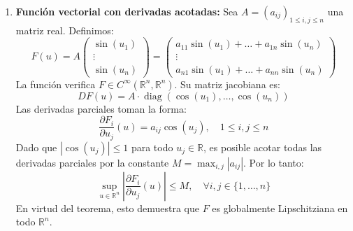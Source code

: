 {\begin{enumerate}
        En cambio, si nos alejamos del origen la situación mejora: para cada $\eta > 0$,
        \[
            \sup_{u \in (\eta, +\infty)} \left| \frac{dF}{du}(u) \right| = \sup_{u > \eta} \frac{q}{u^{1-q}} = \frac{q}{\eta^{1-q}} < +\infty,
        \]
        y como $(\eta, +\infty)$ es abierto y convexo, por el teorema $F$ es \textbf{globalmente} Lipschitziana en $(\eta, +\infty)$ (y, por continuidad, también en $[\eta, +\infty)$), para cualquier $\eta > 0$.

        \item \textbf{Función vectorial con derivadas acotadas:}
        Sea $A = (a_{ij})_{1 \leq i,j \leq n}$ una matriz real. Definimos:
        \[
            F(u) = A \begin{pmatrix} \sin(u_1) \\ \vdots \\ \sin(u_n) \end{pmatrix}
            =
            \begin{pmatrix}
                a_{11} \sin(u_1) + \ldots + a_{1n} \sin(u_n) \\
                \vdots \\
                a_{n1} \sin(u_1) + \ldots + a_{nn} \sin(u_n)
            \end{pmatrix}
        \]
        La función verifica $F \in C^\infty(\mathbb{R}^n, \mathbb{R}^n)$. Su matriz jacobiana es:
        \[
            DF(u) = A \cdot \operatorname{diag}(\cos(u_1), \ldots, \cos(u_n))
        \]
        Las derivadas parciales toman la forma:
        \[
            \frac{\partial F_i}{\partial u_j}(u) = a_{ij} \cos(u_j), \quad 1 \leq i,j \leq n
        \]
        Dado que $|\cos(u_j)| \leq 1$ para todo $u_j \in \mathbb{R}$, es posible acotar todas las derivadas parciales por la constante $M = \max_{i,j} |a_{ij}|$. Por lo tanto:
        \[
            \sup_{u \in \mathbb{R}^n} \left| \frac{\partial F_i}{\partial u_j}(u) \right| \leq M, \quad \forall i, j \in \{ 1, \ldots, n \}
        \]
        En virtud del teorema, esto demuestra que $F$ es globalmente Lipschitziana en todo $\mathbb{R}^n$.


\end{enumerate}}
